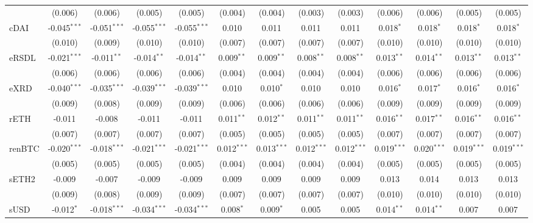 \begin{table}[!htbp]
\begin{tabular}{@{\extracolsep{5pt}}lcccccccccccc}
  & (0.006) & (0.006) & (0.005) & (0.005) & (0.004) & (0.004) & (0.003) & (0.003) & (0.006) & (0.006) & (0.005) & (0.005) \\
 cDAI & -0.045$^{***}$ & -0.051$^{***}$ & -0.055$^{***}$ & -0.055$^{***}$ & 0.010$^{}$ & 0.011$^{}$ & 0.011$^{}$ & 0.011$^{}$ & 0.018$^{*}$ & 0.018$^{*}$ & 0.018$^{*}$ & 0.018$^{*}$ \\
  & (0.010) & (0.009) & (0.010) & (0.010) & (0.007) & (0.007) & (0.007) & (0.007) & (0.010) & (0.010) & (0.010) & (0.010) \\
 eRSDL & -0.021$^{***}$ & -0.011$^{**}$ & -0.014$^{**}$ & -0.014$^{**}$ & 0.009$^{**}$ & 0.009$^{**}$ & 0.008$^{**}$ & 0.008$^{**}$ & 0.013$^{**}$ & 0.014$^{**}$ & 0.013$^{**}$ & 0.013$^{**}$ \\
  & (0.006) & (0.006) & (0.006) & (0.006) & (0.004) & (0.004) & (0.004) & (0.004) & (0.006) & (0.006) & (0.006) & (0.006) \\
 eXRD & -0.040$^{***}$ & -0.035$^{***}$ & -0.039$^{***}$ & -0.039$^{***}$ & 0.010$^{}$ & 0.010$^{*}$ & 0.010$^{}$ & 0.010$^{}$ & 0.016$^{*}$ & 0.017$^{*}$ & 0.016$^{*}$ & 0.016$^{*}$ \\
  & (0.009) & (0.008) & (0.009) & (0.009) & (0.006) & (0.006) & (0.006) & (0.006) & (0.009) & (0.009) & (0.009) & (0.009) \\
 rETH & -0.011$^{}$ & -0.008$^{}$ & -0.011$^{}$ & -0.011$^{}$ & 0.011$^{**}$ & 0.012$^{**}$ & 0.011$^{**}$ & 0.011$^{**}$ & 0.016$^{**}$ & 0.017$^{**}$ & 0.016$^{**}$ & 0.016$^{**}$ \\
  & (0.007) & (0.007) & (0.007) & (0.007) & (0.005) & (0.005) & (0.005) & (0.005) & (0.007) & (0.007) & (0.007) & (0.007) \\
 renBTC & -0.020$^{***}$ & -0.018$^{***}$ & -0.021$^{***}$ & -0.021$^{***}$ & 0.012$^{***}$ & 0.013$^{***}$ & 0.012$^{***}$ & 0.012$^{***}$ & 0.019$^{***}$ & 0.020$^{***}$ & 0.019$^{***}$ & 0.019$^{***}$ \\
  & (0.005) & (0.005) & (0.005) & (0.005) & (0.004) & (0.004) & (0.004) & (0.004) & (0.005) & (0.005) & (0.005) & (0.005) \\
 sETH2 & -0.009$^{}$ & -0.007$^{}$ & -0.009$^{}$ & -0.009$^{}$ & 0.009$^{}$ & 0.009$^{}$ & 0.009$^{}$ & 0.009$^{}$ & 0.013$^{}$ & 0.014$^{}$ & 0.013$^{}$ & 0.013$^{}$ \\
  & (0.009) & (0.008) & (0.009) & (0.009) & (0.007) & (0.007) & (0.007) & (0.007) & (0.010) & (0.010) & (0.010) & (0.010) \\
 sUSD & -0.012$^{*}$ & -0.018$^{***}$ & -0.034$^{***}$ & -0.034$^{***}$ & 0.008$^{*}$ & 0.009$^{*}$ & 0.005$^{}$ & 0.005$^{}$ & 0.014$^{**}$ & 0.014$^{**}$ & 0.007$^{}$ & 0.007$^{}$ \\

\end{tabular}
\end{table}
